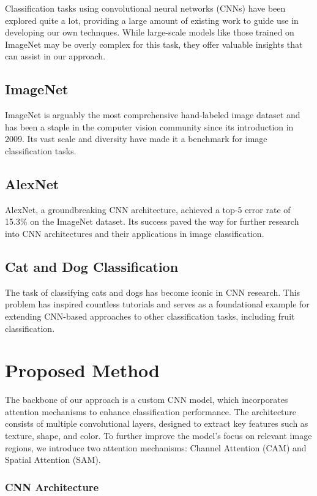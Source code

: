 \documentclass{article}
\begin{document}
Classification tasks using convolutional neural networks (CNNs) have been explored quite a lot, providing a large amount of existing work to guide use in developing our own technques. While large-scale models like those trained on ImageNet \cite{krizhevsky2012imagenet} may be overly complex for this task, they offer valuable insights that can assist in our approach.

\subsection*{ImageNet}
ImageNet is arguably the most comprehensive hand-labeled image dataset and has been a staple in the computer vision community since its introduction in 2009. Its vast scale and diversity have made it a benchmark for image classification tasks.

\subsection*{AlexNet}
AlexNet, a groundbreaking CNN architecture, achieved a top-5 error rate of 15.3\% on the ImageNet dataset. Its success paved the way for further research into CNN architectures and their applications in image classification.

\subsection*{Cat and Dog Classification}
The task of classifying cats and dogs has become iconic in CNN research. This problem has inspired countless tutorials and serves as a foundational example for extending CNN-based approaches to other classification tasks, including fruit classification.


\section{Proposed Method}

The backbone of our approach is a custom CNN model, which incorporates attention mechanisms to enhance classification performance. The architecture consists of multiple convolutional layers, designed to extract key features such as texture, shape, and color. To further improve the model's focus on relevant image regions, we introduce two attention mechanisms: Channel Attention (CAM) and Spatial Attention (SAM).


\subsubsection{CNN Architecture}
\end{document}

